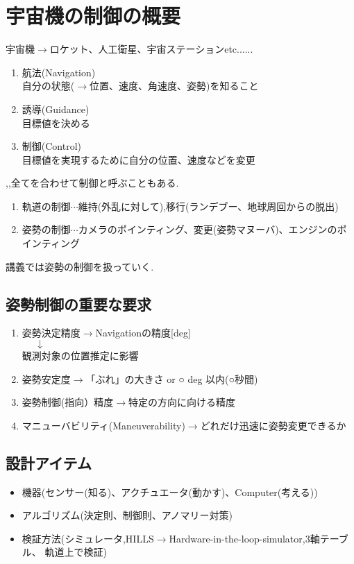 \documentclass[class=article, crop=false, preview=false, dvipdfmx, a4paper]{standalone}
\begin{document}
\section{宇宙機の制御の概要}

宇宙機$\rightarrow$ロケット、人工衛星、宇宙ステーションetc......
\begin{enumerate}[label = \maru{\theenumi}]
\item 航法(Navigation)\\
自分の状態($\rightarrow$位置、速度、角速度、姿勢)を知ること
\item 誘導(Guidance)\\
目標値を決める
\item 制御(Control)\\
目標値を実現するために自分の位置、速度などを変更
\end{enumerate}
,,全てを合わせて制御と呼ぶこともある.

\begin{enumerate}
      \renewcommand{\labelenumi}{\alph{enumi}).}
      \item 軌道の制御$\cdots$維持(外乱に対して),移行(ランデブー、地球周回からの脱出)
      \item 姿勢の制御$\cdots$カメラのポインティング、変更(姿勢マヌーバ)、エンジンのポインティング
\end{enumerate}
講義では姿勢の制御を扱っていく.


\subsection{姿勢制御の重要な要求}
\begin{enumerate}
\item 姿勢決定精度$\rightarrow$Navigationの精度[deg]\\
		$\mbox{    　}\downarrow$\\
 観測対象の位置推定に影響
\item 姿勢安定度$\rightarrow$「ぶれ」の大きさ  or ○ deg 以内(○秒間)
\item 姿勢制御(指向）精度$\rightarrow$特定の方向に向ける精度
\item マニューバビリティ(Maneuverability)$\rightarrow$どれだけ迅速に姿勢変更できるか
\end{enumerate}


\subsection{設計アイテム}
\begin{itemize}
\item 機器(センサー(知る)、アクチュエータ(動かす)、Computer(考える))
\item アルゴリズム(決定則、制御則、アノマリー対策)
\item 検証方法(シミュレータ,HILLS$\rightarrow$Hardware-in-the-loop-simulator,3軸テーブル、
軌道上で検証)
\end{itemize}
\end{document}
